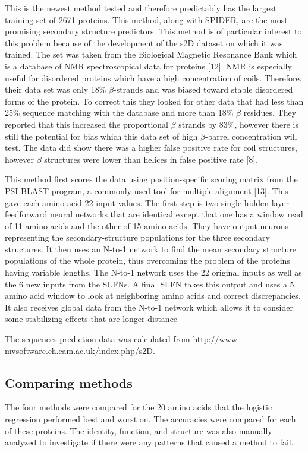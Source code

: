 \documentclass{article}
\begin{document}
This is the newest method tested and therefore predictably has the largest training set of 2671 proteins. This method, along with SPIDER, are the most promising secondary structure predictors. This method is of particular interest to this problem because of the development of the s2D dataset on which it was trained. The set was taken from the Biological Magnetic Resonance Bank which is a database of NMR spectroscopical data for proteins [12]. NMR is especially useful for disordered proteins which have a high concentration of coils. Therefore, their data set was only 18\% $\beta$-strands and was biased toward stable disordered forms of the protein. To correct this they looked for other data that had less than 25\% sequence matching with the database and more than 18\% $\beta$ residues. They reported that this increased the proportional $\beta$ strands by 83\%, however there is still the potential for bias which this data set of high $\beta$-barrel concentration will test. The data did show there was a higher false positive rate for coil structures, however $\beta$ structures were lower than helices in false positive rate [8].

This method first scores the data using position-specific scoring matrix from the PSI-BLAST program, a commonly used tool for multiple alignment [13]. This gave each amino acid 22 input values. The first step is two single hidden layer feedforward neural networks that are identical except that one has a window read of 11 amino acids and the other of 15 amino acids. They have output neurons representing the secondary-structure populations for the three secondary structures. It then uses an N-to-1 network to find the mean secondary structure populations of the whole protein, thus overcoming the problem of the proteins having variable lengths. The N-to-1 network uses the 22 original inputs as well as the 6 new inputs from the SLFNs. A final SLFN takes this output and uses a 5 amino acid window to look at neighboring amino acids and correct discrepancies. It also receives global data from the N-to-1 network which allows it to consider some stabilizing effects that are longer distance

The sequences prediction data was calculated from \url{http://www-mvsoftware.ch.cam.ac.uk/index.php/s2D}.

\subsection{Comparing methods}
The four methods were compared for the 20 amino acids that the logistic regression performed best and worst on. The accuracies were compared for each of these proteins. The identity, function, and structure was also manually analyzed to investigate if there were any patterns that caused a method to fail.
\end{document}

